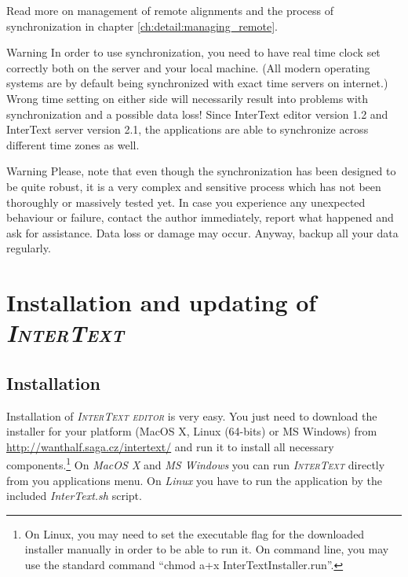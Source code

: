 \documentclass[a4paper,10pt,oneside]{book}
\newcommand{\IT}{\textit{\textsc{InterText}}\xspace}
\newcommand{\ITeditor}{\textit{\textsc{InterText editor}}\xspace}
\begin{document}
Read more on management of remote alignments and the process of synchronization in chapter \ref{ch:detail:managing_remote}.

\medskip
\begin{bclogo}[couleur = blue!30, arrondi = 0.1, logo = \bcattention,
ombre = true , epOmbre = 0.125, couleurOmbre = black!30, blur, epBord = 0.3, marge = 5]{Warning}\small
In order to use synchronization, you need to have real time clock set correctly both on the server and your local machine. (All modern operating systems are by default being synchronized with exact time servers on internet.) Wrong time setting on either side will necessarily result into problems with synchronization and a possible data loss! Since InterText editor version 1.2 and InterText server version 2.1, the applications are able to synchronize across different time zones as well.
\end{bclogo}
\medskip
\begin{bclogo}[couleur = blue!30, arrondi = 0.1, logo = \bcattention,
ombre = true , epOmbre = 0.125, couleurOmbre = black!30, blur, epBord = 0.3, marge = 5]{Warning}\small
Please, note that even though the synchronization has been designed to be quite robust, it is a very complex and sensitive process which has not been thoroughly or massively tested yet. In case you experience any unexpected behaviour or failure, contact the author immediately, report what happened and ask for assistance. Data loss or damage may occur. Anyway, backup all your data regularly.
\end{bclogo}

\chapter{Installation and updating of \IT}\label{ch:intro:installation}

\section{Installation}

Installation of \ITeditor is very easy. You just need to download the installer for your platform (MacOS X, Linux (64-bits) or MS Windows) from \url{http://wanthalf.saga.cz/intertext/} and run it to install all necessary components.\footnote{On Linux, you may need to set the executable flag for the downloaded installer manually in order to be able to run it. On command line, you may use the standard command ``chmod a+x InterTextInstaller.run''.} On \emph{MacOS X} and \emph{MS Windows} you can run \IT directly from you applications menu. On \emph{Linux} you have to run the application by the included \emph{InterText.sh} script.
\end{document}
